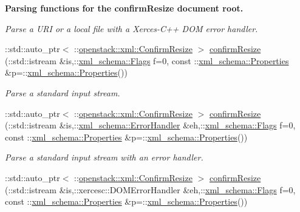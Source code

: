 \begin{Indent}{\bf Parsing functions for the confirmResize document root.}
\begin{DoxyCompactItemize}
\begin{DoxyCompactList}\small\item\em Parse a URI or a local file with a Xerces-\/C++ DOM error handler. \item\end{DoxyCompactList}\item 
::std::auto\_\-ptr$<$ ::\hyperlink{classopenstack_1_1xml_1_1ConfirmResize}{openstack::xml::ConfirmResize} $>$ \hyperlink{namespaceopenstack_1_1xml_a4a9881bd1212d07f90100c38b5a3d023}{confirmResize} (::std::istream \&is,::\hyperlink{namespacexml__schema_affb4c227cbd9aa7453dd1dc5a1401943}{xml\_\-schema::Flags} f=0, const ::\hyperlink{namespacexml__schema_ad27ce19a7ee1d3b1064092648898f64c}{xml\_\-schema::Properties} \&p=::\hyperlink{namespacexml__schema_ad27ce19a7ee1d3b1064092648898f64c}{xml\_\-schema::Properties}())
\begin{DoxyCompactList}\small\item\em Parse a standard input stream. \item\end{DoxyCompactList}\item 
::std::auto\_\-ptr$<$ ::\hyperlink{classopenstack_1_1xml_1_1ConfirmResize}{openstack::xml::ConfirmResize} $>$ \hyperlink{namespaceopenstack_1_1xml_a22310f8ed0cb54091cbc063848a7563f}{confirmResize} (::std::istream \&is,::\hyperlink{namespacexml__schema_ab1c9361bfd3b404eaabf0c31eded79dc}{xml\_\-schema::ErrorHandler} \&eh,::\hyperlink{namespacexml__schema_affb4c227cbd9aa7453dd1dc5a1401943}{xml\_\-schema::Flags} f=0, const ::\hyperlink{namespacexml__schema_ad27ce19a7ee1d3b1064092648898f64c}{xml\_\-schema::Properties} \&p=::\hyperlink{namespacexml__schema_ad27ce19a7ee1d3b1064092648898f64c}{xml\_\-schema::Properties}())
\begin{DoxyCompactList}\small\item\em Parse a standard input stream with an error handler. \item\end{DoxyCompactList}\item 
::std::auto\_\-ptr$<$ ::\hyperlink{classopenstack_1_1xml_1_1ConfirmResize}{openstack::xml::ConfirmResize} $>$ \hyperlink{namespaceopenstack_1_1xml_a1dead9da88906af1abd1218007340e43}{confirmResize} (::std::istream \&is,::xercesc::DOMErrorHandler \&eh,::\hyperlink{namespacexml__schema_affb4c227cbd9aa7453dd1dc5a1401943}{xml\_\-schema::Flags} f=0, const ::\hyperlink{namespacexml__schema_ad27ce19a7ee1d3b1064092648898f64c}{xml\_\-schema::Properties} \&p=::\hyperlink{namespacexml__schema_ad27ce19a7ee1d3b1064092648898f64c}{xml\_\-schema::Properties}())

\end{DoxyCompactItemize}
\end{Indent}

